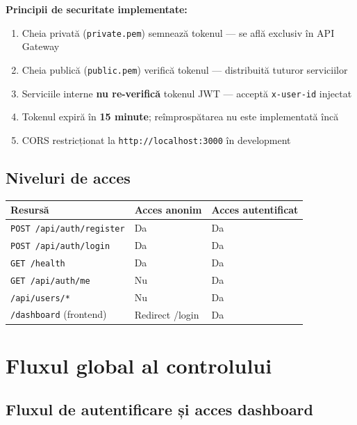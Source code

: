 \documentclass[12pt, a4paper]{report}
\begin{document}
\textbf{Principii de securitate implementate:}
\begin{enumerate}[leftmargin=*]
  \item Cheia privată (\texttt{private.pem}) semnează tokenul — se află exclusiv în API Gateway
  \item Cheia publică (\texttt{public.pem}) verifică tokenul — distribuită tuturor serviciilor
  \item Serviciile interne \textbf{nu re-verifică} tokenul JWT — acceptă \texttt{x-user-id} injectat
  \item Tokenul expiră în \textbf{15 minute}; reîmprospătarea nu este implementată încă
  \item CORS restricționat la \texttt{http://localhost:3000} în development
\end{enumerate}

\subsection{Niveluri de acces}

\begin{center}
\begin{tabular}{lll}
\toprule
\rowcolor{primary!15}
\textbf{Resursă} & \textbf{Acces anonim} & \textbf{Acces autentificat} \\
\midrule
\texttt{POST /api/auth/register} & Da & Da \\
\texttt{POST /api/auth/login}    & Da & Da \\
\texttt{GET /health}             & Da & Da \\
\texttt{GET /api/auth/me}        & Nu & Da \\
\texttt{/api/users/*}            & Nu & Da \\
\texttt{/dashboard} (frontend)   & Redirect /login & Da \\
\bottomrule
\end{tabular}
\end{center}

\section{Fluxul global al controlului}

\subsection{Fluxul de autentificare și acces dashboard}
\end{document}
